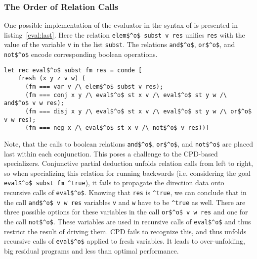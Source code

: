 \subsubsection{The Order of Relation Calls}

One possible implementation of the evaluator in the syntax of \oc{} is presented in listing~\ref{eval:last}.
Here the relation \lstinline{elem$^o$ subst v res} unifies \lstinline{res} with the value of the variable \lstinline{v} in the list \lstinline{subst}.
The relations \lstinline{and$^o$}, \lstinline{or$^o$}, and \lstinline{not$^o$} encode corresponding boolean operations.

\begin{figure*}[!h]
  \centering
  \begin{minipage}{0.8\textwidth}
    \begin{lstlisting}[label={eval:last}, caption={Evaluator of formulas with boolean operation last}, captionpos=b, frame=tb]
  let rec eval$^o$ subst fm res = conde [
    fresh (x y z v w) (
      (fm === var v /\ elem$^o$ subst v res);
      (fm === conj x y /\ eval$^o$ st x v /\ eval$^o$ st y w /\ and$^o$ v w res);
      (fm === disj x y /\ eval$^o$ st x v /\ eval$^o$ st y w /\ or$^o$ v w res);
      (fm === neg x /\ eval$^o$ st x v /\ not$^o$ v res))]
    \end{lstlisting}
  \end{minipage}
\end{figure*}

Note, that the calls to boolean relations \lstinline{and$^o$}, \lstinline{or$^o$}, and \lstinline{not$^o$} are placed last within each conjunction.
This poses a challenge to the CPD-based specializers.
Conjunctive partial deduction unfolds relation calls from left to right, so when specializing this relation for running backwards (i.e. considering the goal \lstinline{eval$^o$ subst fm ^true}), it fails to propagate the direction data onto recursive calls of \lstinline{eval$^o$}.
Knowing that \lstinline{res} is \lstinline{^true}, we can conclude that in the call \lstinline{and$^o$ v w res} variables \lstinline{v} and \lstinline{w} have to be \lstinline{^true} as well.
There are three possible options for these variables in the call \lstinline{or$^o$ v w res} and one for the call \lstinline{not$^o$}.
These variables are used in recursive calls of \lstinline{eval$^o$} and thus restrict the result of driving them.
CPD fails to recognize this, and thus unfolds recursive calls of \lstinline{eval$^o$} applied to fresh variables.
It leads to over-unfolding, big residual programs and less than optimal performance.

